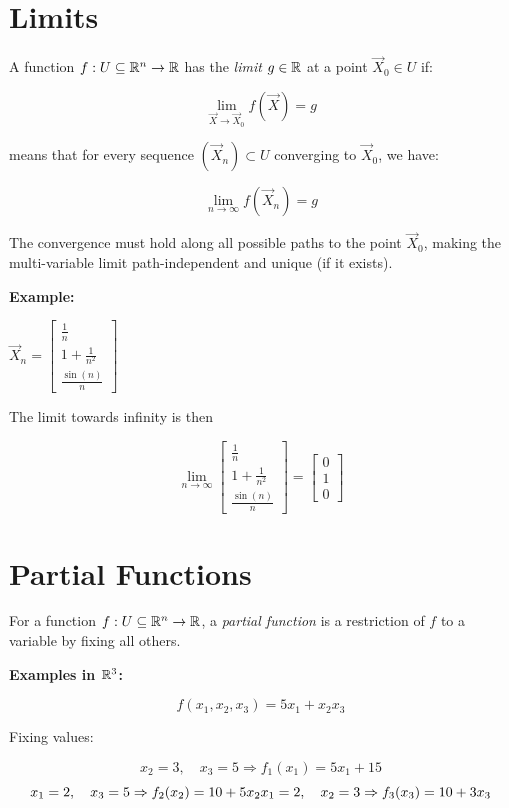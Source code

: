 \section{Limits}

A function \( f : U \subseteq \mathbb{R}^n \to \mathbb{R} \) has the \emph{limit} \( g \in \mathbb{R} \) at a 
point \( \vec{X}_0 \in U \) if:

\[
    \lim_{\vec{X} \to \vec{X}_0} f(\vec{X}) = g
\]

means that for every sequence \( (\vec{X}_n) \subset U \) converging to \( \vec{X}_0 \), we have:

\[
    \lim_{n \to \infty} f(\vec{X}_n) = g
\]

The convergence must hold along all possible paths to the point \( \vec{X}_0 \), making the 
multi-variable limit path-independent and unique (if it exists).

\textbf{Example:}

\(\vec{X}_n = \begin{bmatrix} \frac{1}{n} \\ 1 + \frac{1}{n^2} \\ \frac{\sin(n)}{n} \end{bmatrix}\)

The limit towards infinity is then 

\[
    \lim_{n \to \infty} \begin{bmatrix} \frac{1}{n} \\ 1 + \frac{1}{n^2} \\ \frac{\sin(n)}{n} \end{bmatrix}
    = \begin{bmatrix}
        0 \\ 1 \\ 0
    \end{bmatrix}
\]

\section{Partial Functions}

For a function \( f: U \subseteq \mathbb{R}^n \to \mathbb{R} \), a \emph{partial function} is a 
restriction of \(f\) to a variable by fixing all others.

\textbf{Examples in \( \mathbb{R}^3 \):}

\[
    f(x_1, x_2, x_3) = 5x_1 + x_2 x_3
\]

Fixing values:

\[
    x_2 = 3, \quad x_3 = 5 \Rightarrow f_1(x_1) = 5x_1 + 15 
\]
\[
    x_1 = 2, \quad x_3 = 5 \Rightarrow f_2(x_2) = 10 + 5x_2 \\
    x_1 = 2, \quad x_2 = 3 \Rightarrow f_3(x_3) = 10 + 3x_3
\]

